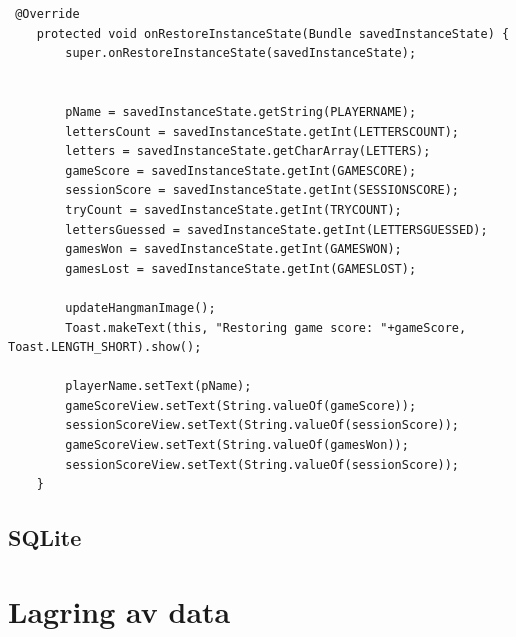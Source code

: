 \begin{lstlisting}
 @Override
    protected void onRestoreInstanceState(Bundle savedInstanceState) {
        super.onRestoreInstanceState(savedInstanceState);


        pName = savedInstanceState.getString(PLAYERNAME);
        lettersCount = savedInstanceState.getInt(LETTERSCOUNT);
        letters = savedInstanceState.getCharArray(LETTERS);
        gameScore = savedInstanceState.getInt(GAMESCORE);
        sessionScore = savedInstanceState.getInt(SESSIONSCORE);
        tryCount = savedInstanceState.getInt(TRYCOUNT);
        lettersGuessed = savedInstanceState.getInt(LETTERSGUESSED);
        gamesWon = savedInstanceState.getInt(GAMESWON);
        gamesLost = savedInstanceState.getInt(GAMESLOST);

        updateHangmanImage();
        Toast.makeText(this, "Restoring game score: "+gameScore, Toast.LENGTH_SHORT).show();

        playerName.setText(pName);
        gameScoreView.setText(String.valueOf(gameScore));
        sessionScoreView.setText(String.valueOf(sessionScore));
        gameScoreView.setText(String.valueOf(gamesWon));
        sessionScoreView.setText(String.valueOf(sessionScore));
    }
\end{lstlisting}

\section{SQLite}

\chapter{Lagring av data}

